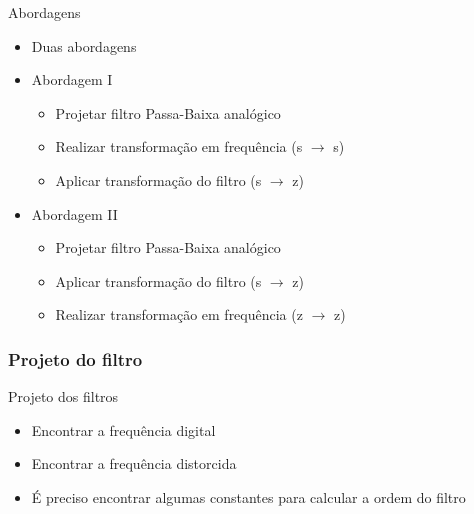 \documentclass{beamer}
\begin{document}
	\begin{frame}{Abordagens}
		\begin{itemize}
			\item Duas abordagens
		\end{itemize}
		\begin{itemize}
			\item  Abordagem I
				\begin{itemize}
					\item Projetar filtro Passa-Baixa anal\'ogico
					\item Realizar transforma\c{c}\~ao em frequ\^encia (s \(\rightarrow\) s)
					\item Aplicar transforma\c{c}\~ao do filtro (s \(\rightarrow\) z)
				\end{itemize}
	\end{itemize}
		\begin{itemize}
			\item Abordagem II
				\begin{itemize}
					\item Projetar filtro Passa-Baixa anal\'ogico
					\item Aplicar transforma\c{c}\~ao do filtro (s \(\rightarrow\) z)
					\item Realizar transforma\c{c}\~ao em frequ\^encia (z \(\rightarrow\) z)
				\end{itemize}
		\end{itemize}
	\end{frame}

\subsubsection{Projeto do filtro}
	\begin{frame}{Projeto dos filtros}
		\begin{itemize}
		 \item Encontrar a frequ\^encia digital \omega
		\end{itemize}
		\begin{itemize}
		 \item Encontrar a frequ\^encia distorcida \Omega
		\end{itemize}
		\begin{itemize}
		 \item \'E preciso encontrar algumas constantes para calcular a ordem do filtro
		\end{itemize}
	\end{frame}
	
\end{document}
